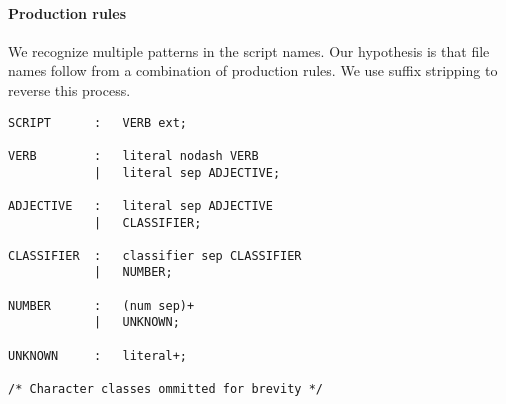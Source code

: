 \documentclass[11pt,a4paper,oneside]{scrartcl}
\begin{document}
\paragraph{Production rules}
We recognize multiple patterns in the script names. Our hypothesis is that file names follow from a combination of production rules. We use suffix stripping to reverse this process.

\begin{verbatim}
SCRIPT      :   VERB ext;

VERB        :   literal nodash VERB
            |   literal sep ADJECTIVE;

ADJECTIVE   :   literal sep ADJECTIVE
            |   CLASSIFIER;

CLASSIFIER  :   classifier sep CLASSIFIER
            |   NUMBER;

NUMBER      :   (num sep)+
            |   UNKNOWN;

UNKNOWN     :   literal+;

/* Character classes ommitted for brevity */
\end{verbatim}
\end{document}
